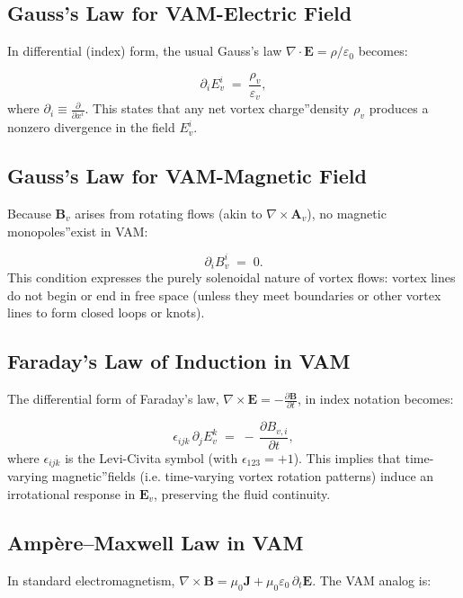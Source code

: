 \subsection{Gauss's Law for VAM-Electric Field}

In differential (index) form, the usual Gauss's law \(\nabla\cdot\mathbf{E} = \rho/\varepsilon_0\) becomes:

\[
    \partial_i E_{v}^i
    \;=\;
    \frac{\rho_v}{\varepsilon_v},
    \tag{1}
\]
where \(\partial_i \equiv \frac{\partial}{\partial x^i}\). This states that any net vortex \grqq charge\textquotedblright density \(\rho_v\) produces a nonzero divergence in the field \(E_{v}^i\).

\subsection{Gauss's Law for VAM-Magnetic Field}

Because \(\mathbf{B}_v\) arises from rotating flows (akin to \(\nabla\times \mathbf{A}_v\)), no \grqq magnetic monopoles\textquotedblright exist in VAM:

\[
    \partial_i B_{v}^i
    \;=\; 0.
    \tag{2}
\]
This condition expresses the purely solenoidal nature of vortex flows: vortex lines do not begin or end in free space (unless they meet boundaries or other vortex lines to form closed loops or knots).

\subsection{Faraday's Law of Induction in VAM}

The differential form of Faraday's law, \(\nabla\times \mathbf{E} = -\frac{\partial \mathbf{B}}{\partial t}\), in index notation becomes:

\[
    \epsilon_{ijk}\,\partial_j E_{v}^k
    \;=\;
    -\,\frac{\partial B_{v,i}}{\partial t},
    \tag{3}
\]
where \(\epsilon_{ijk}\) is the Levi-Civita symbol (with \(\epsilon_{123} = +1\)). This implies that time-varying \grqq magnetic\textquotedblright fields (i.e. time-varying vortex rotation patterns) induce an irrotational response in \(\mathbf{E}_v\), preserving the fluid continuity.

\subsection{Ampère--Maxwell Law in VAM}

In standard electromagnetism, \(\nabla\times \mathbf{B} = \mu_0 \mathbf{J} + \mu_0\varepsilon_0\,\partial_t\mathbf{E}\). The VAM analog is:

